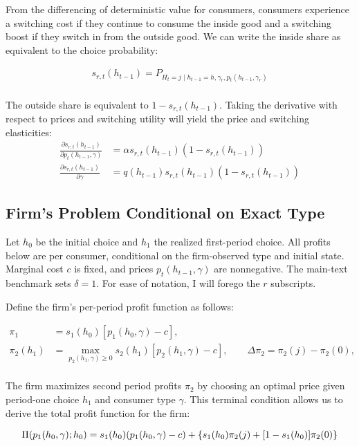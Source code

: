 \documentclass[12pt]{article}
\theoremstyle{definition}
\theoremstyle{remark}
\begin{document}
From the differencing of deterministic value for consumers, consumers experience a switching cost if they continue to consume the inside good and a switching boost if they switch in from the outside good. We can write the inside share as equivalent to the choice probability:

\begin{align*}
  s_{r, t}(h_{t-1}) = P_{H_t=j\mid h_{t-1}=h, \gamma_r, p_t(h_{t-1}, \gamma_r)} \\
\end{align*}

The outside share is equivalent to $1 - s_{r,t}(h_{t-1})$. Taking the derivative with respect to prices and switching utility will yield the price and switching elasticities:
\begin{align*}
  \frac{\partial s_{r, t}(h_{t-1})}{\partial p_t(h_{t-1}, \gamma)} &= \alpha s_{r,t}(h_{t-1})(1-s_{r,t}(h_{t-1})) \\
  \frac{\partial s_{r,t}(h_{t-1})}{\partial\gamma} &= q(h_{t-1})s_{r,t}(h_{t-1})(1-s_{r,t}(h_{t-1}))
\end{align*}


\subsection{Firm's Problem Conditional on Exact Type}
\label{subsec:firm-problem}
Let $h_0$ be the initial choice and $h_1$ the realized first-period choice.
All profits below are per consumer, conditional on the firm-observed type and initial state.
Marginal cost $c$ is fixed, and prices $p_{t}(h_{t-1}, \gamma)$ are nonnegative. The main-text benchmark sets $\delta=1$. For ease of notation, I will forego the $r$ subscripts. 

Define the firm's per-period profit function as follows:

\begin{align}
  \pi_1 &= s_1(h_0)[p_1(h_0, \gamma)-c], \\
 \pi_2(h_1)&=\max_{p_2(h_1, \gamma)\geq 0}s_2(h_1)[p_2(h_1,\gamma)-c],
 \qquad \Delta \pi_2=\pi_2(j)-\pi_2(0),\\
\end{align}

The firm maximizes second period profits $\pi_2$ by choosing an optimal price given period-one choice $h_1$ and consumer type $\gamma$. This terminal condition allows us to derive the total profit function for the firm:

\begin{align}
\Pi(p_1(h_0, \gamma);h_0)&=s_1(h_0)(p_1(h_0,\gamma)-c)
 +\{s_1(h_0)\pi_2(j)+[1-s_1(h_0)]\pi_2(0)\}\notag\\
 \label{eq:supply-profit}\\
\end{align}
\end{document}

